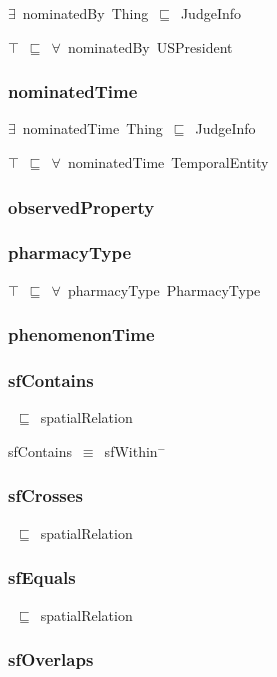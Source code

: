 \documentclass{article}
\begin{document}
\ensuremath{\exists}~nominatedBy~Thing~\ensuremath{\sqsubseteq}~JudgeInfo

\ensuremath{\top}~\ensuremath{\sqsubseteq}~\ensuremath{\forall}~nominatedBy~USPresident

\subsubsection*{nominatedTime}

\ensuremath{\exists}~nominatedTime~Thing~\ensuremath{\sqsubseteq}~JudgeInfo

\ensuremath{\top}~\ensuremath{\sqsubseteq}~\ensuremath{\forall}~nominatedTime~TemporalEntity

\subsubsection*{observedProperty}

\subsubsection*{pharmacyType}

\ensuremath{\top}~\ensuremath{\sqsubseteq}~\ensuremath{\forall}~pharmacyType~PharmacyType

\subsubsection*{phenomenonTime}

\subsubsection*{sfContains}

~\ensuremath{\sqsubseteq}~spatialRelation

sfContains~\ensuremath{\equiv}~sfWithin\ensuremath{^-}

\subsubsection*{sfCrosses}

~\ensuremath{\sqsubseteq}~spatialRelation

\subsubsection*{sfEquals}

~\ensuremath{\sqsubseteq}~spatialRelation

\subsubsection*{sfOverlaps}
\end{document}
